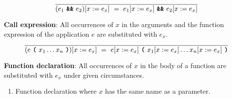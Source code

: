 \[
\frac{
}{
  (e_1\  \textbf{\texttt{\&\&}}\ e_2)[x := e_x]
  \ = \ 
  e_1[x := e_x]\  \textbf{\texttt{\&\&}}\ e_2[x := e_x]
}
\]

\vspace{10mm}
\textbf{Call expression}: All occurrences of $x$ in the arguments and the function expression of the application $e$ are substituted with $e_x$.
\[
\frac{
}{
  (e \ \textbf{\texttt{(}}\ x_1 \ldots x_n \ \textbf{\texttt{)}})[x := e_x]
  \ = \ 
  e[x := e_x] \ \textbf{\texttt{(}}\ x_1[x := e_x] \ldots x_n[x := e_x] \ \textbf{\texttt{)}}
}
\]

\textbf{Function declaration}: All occurrences of $x$ in the body of a function are substituted with $e_x$ under given circumstances.
\begin{enumerate}
    \item Function declaration where $x$ has the same name as a parameter.


\end{enumerate}
